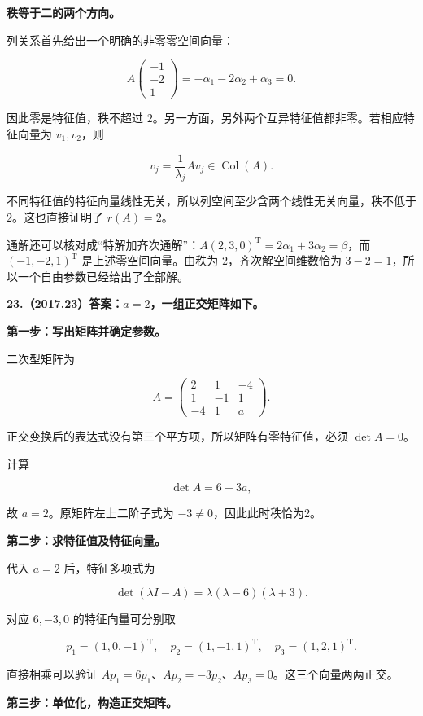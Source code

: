 \documentclass[UTF8,11pt,fontset=windows]{ctexart}
\begin{document}
\textbf{秩等于二的两个方向。}

列关系首先给出一个明确的非零零空间向量：

$$
A\begin{pmatrix}-1\\-2\\1\end{pmatrix}
=-\alpha_1-2\alpha_2+\alpha_3=0.
$$

因此零是特征值，秩不超过 $2$。另一方面，另外两个互异特征值都非零。若相应特征向量为 $v_1,v_2$，则

$$
v_j=\frac1{\lambda_j}Av_j\in\operatorname{Col}(A).
$$

不同特征值的特征向量线性无关，所以列空间至少含两个线性无关向量，秩不低于 $2$。这也直接证明了 $r(A)=2$。

通解还可以核对成“特解加齐次通解”：$A(2,3,0)^{\mathrm T}=2\alpha_1+3\alpha_2=\beta$，而 $(-1,-2,1)^{\mathrm T}$ 是上述零空间向量。由秩为 $2$，齐次解空间维数恰为 $3-2=1$，所以一个自由参数已经给出了全部解。

\clearpage

\textbf{23.（2017.23）答案：$a=2$，一组正交矩阵如下。}

\textbf{第一步：写出矩阵并确定参数。}

二次型矩阵为

$$
A=\begin{pmatrix}2&1&-4\\1&-1&1\\-4&1&a\end{pmatrix}.
$$

正交变换后的表达式没有第三个平方项，所以矩阵有零特征值，必须 $\det A=0$。

计算

$$
\det A=6-3a,
$$

故 $a=2$。原矩阵左上二阶子式为 $-3\ne0$，因此此时秩恰为2。

\textbf{第二步：求特征值及特征向量。}

代入 $a=2$ 后，特征多项式为

$$
\det(\lambda I-A)=\lambda(\lambda-6)(\lambda+3).
$$

对应 $6,-3,0$ 的特征向量可分别取

$$
p_1=(1,0,-1)^{\mathrm T},\quad
p_2=(1,-1,1)^{\mathrm T},\quad
p_3=(1,2,1)^{\mathrm T}.
$$

直接相乘可以验证 $Ap_1=6p_1$、$Ap_2=-3p_2$、$Ap_3=0$。这三个向量两两正交。

\textbf{第三步：单位化，构造正交矩阵。}
\end{document}
